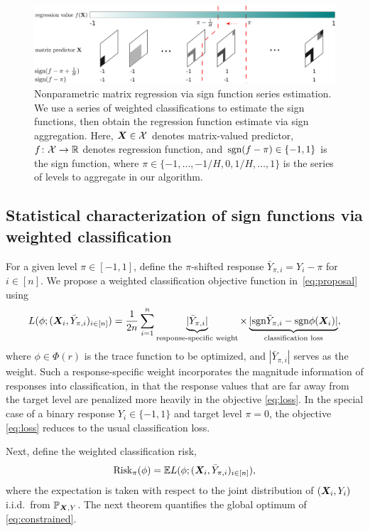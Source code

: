 \documentclass[aos]{imsart}
\theoremstyle{definition}
\newcommand*{\KeepStyleUnderBrace}[1]{%
\mathop{%
\mathchoice
{\underbrace{\displaystyle#1}}%
{\underbrace{\textstyle#1}}%
{\underbrace{\scriptstyle#1}}%
{\underbrace{\scriptscriptstyle#1}}%
}\limits
}
\def\sign{\textup{sgn}}
\def\risk{\textup{Risk}}
\begin{document}
\begin{figure}[t!]
\includegraphics[width=\textwidth]{figure/demo_method.pdf}
\caption{Nonparametric matrix regression via sign function series estimation. We use a series of weighted classifications to estimate the sign functions, then obtain the regression function estimate via sign aggregation. Here, $\bm X\in\mathcal{X}$ denotes matrix-valued predictor, $f\colon \mathcal{X}\to \mathbb{R}$ denotes regression function, and $\sign(f-\pi)\in\{-1,1\}$ is the sign function, where $\pi\in\{-1,\ldots,-1/H,0,1/H,\ldots, 1\}$ is the series of levels to aggregate in our algorithm.}
\label{fig:method}
\end{figure}



\subsection{Statistical characterization of sign functions via weighted classification}

For a given level $\pi\in[-1,1]$, define the $\pi$-shifted response $\bar Y_{\pi,i} =Y_i-\pi$ for $i\in[n]$. We propose a weighted classification objective function in~\eqref{eq:proposal} using 
\begin{equation}\label{eq:loss}
L(\phi;(\mX_i,\bar Y_{\pi,i})_{i\in[n]})={1\over 2n}\sum_{i=1}^n\KeepStyleUnderBrace{|\bar Y_{\pi,i}|}_{\text{response-specific weight}}\times\KeepStyleUnderBrace{|\sign \bar Y_{\pi,i} - \sign \phi(\mX_i)|}_{\text{classification loss}},
\end{equation}
where $\phi\in \Phi(r)$ is the trace function to be optimized, and $|\bar Y_{\pi, i}|$ serves as the weight. Such a response-specific weight incorporates the magnitude information of responses into classification, in that the response values that are far away from the target level are penalized more heavily in the objective \eqref{eq:loss}. In the special case of a binary response $Y_i\in\{-1,1\}$ and target level $\pi=0$, the objective \eqref{eq:loss} reduces to the usual classification loss. 

Next, define the weighted classification risk, 
\begin{equation}\label{eq:constrained}
\risk_\pi(\phi)=\mathbb{E}L(\phi; (\mX_i,\bar Y_{\pi,i})_{i\in[n]}),
\end{equation}
where the expectation is taken with respect to the joint distribution of $(\bm X_i,Y_i)$ i.i.d.\ from $\mathbb{P}_{\bm X,Y}$. The next theorem quantifies the global optimum of \eqref{eq:constrained}. 
\end{document}
